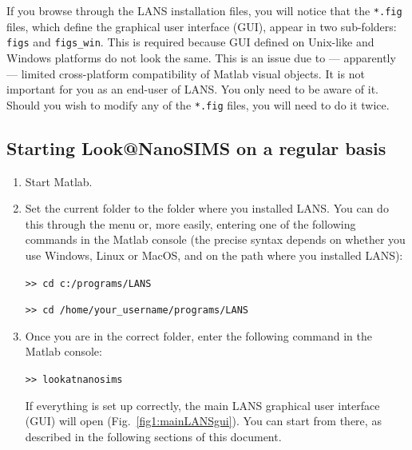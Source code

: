 \documentclass[a4paper, 11pt]{article}
\newcommand{\ttt}[1]{\texttt{#1}}
\newcommand\mnote{\marginnote{\fbox{\textbf{\bf Note}}}}
\begin{document}
\mnote
If you browse through the LANS installation files, you will notice that the \ttt{*.fig} files, which define the graphical user interface (GUI), appear in two sub-folders: \ttt{figs} and \ttt{figs\_win}. This is required because GUI defined on Unix-like and Windows platforms do not look the same. This is an issue due to --- apparently --- limited cross-platform compatibility of Matlab visual objects. It is not important for you as an end-user of LANS. You only need to be aware of it. Should you wish to modify any of the \ttt{*.fig} files, you will need to do it twice.


\subsection{Starting Look@NanoSIMS on a regular basis}

\begin{enumerate}

\item Start Matlab.

\item Set the current folder to the folder where you installed LANS. You can do this through the menu or, more easily, entering one of the following commands in the Matlab console (the precise syntax depends on whether you use Windows, Linux or MacOS, and on the path where you installed LANS):

\ttt{>> cd c:/programs/LANS}

\ttt{>> cd /home/your\_username/programs/LANS}

\item Once you are in the correct folder, enter the following command in the Matlab console:

\ttt{>> lookatnanosims}

If everything is set up correctly, the main LANS graphical user interface (GUI) will open (Fig.~\ref{fig1:mainLANSgui}). You can start from there, as described in the following sections of this document. 

\end{enumerate}
\end{document}
